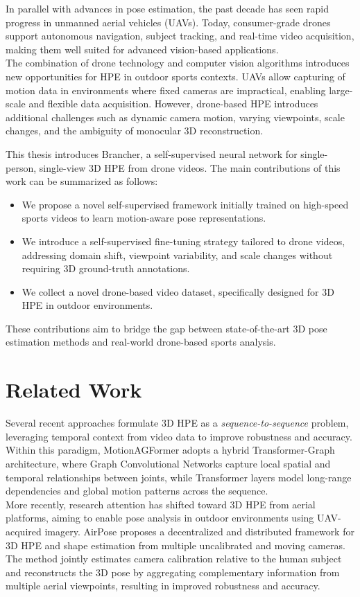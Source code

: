 \documentclass[11pt,a4paper,twocolumn]{article}
\begin{document}
In parallel with advances in pose estimation, the past decade has seen rapid progress in unmanned aerial vehicles (UAVs). Today, consumer-grade drones support autonomous navigation, subject tracking, and real-time video acquisition, 
making them well suited for advanced vision-based applications.\\
The combination of drone technology and computer vision algorithms introduces new opportunities for HPE in outdoor sports contexts. UAVs allow capturing of motion data in environments where fixed 
cameras are impractical, enabling large-scale and flexible data acquisition. However, drone-based HPE introduces additional challenges such as dynamic camera motion, varying viewpoints, scale changes, and the ambiguity 
of monocular 3D reconstruction.

This thesis introduces Brancher, a self-supervised neural network for single-person, single-view 3D HPE from drone videos. The main contributions of this work can be summarized as follows:
\begin{itemize}
    \item We propose a novel self-supervised framework initially trained on high-speed sports videos to learn motion-aware pose representations.
    \item We introduce a self-supervised fine-tuning strategy tailored to drone videos, addressing domain shift, viewpoint variability, and scale changes without requiring 3D ground-truth annotations.
    \item We collect a novel drone-based video dataset, specifically designed for 3D HPE in outdoor environments.
\end{itemize}
These contributions aim to bridge the gap between state-of-the-art 3D pose estimation methods and real-world drone-based sports analysis.


\section{Related Work}
Several recent approaches formulate 3D HPE as a \textit{sequence-to-sequence} problem, leveraging temporal context from video data to improve robustness and accuracy. Within this paradigm, MotionAGFormer \cite{mehraban2024motionagformer} 
adopts a hybrid Transformer-Graph architecture, where Graph Convolutional Networks capture local spatial and temporal relationships between joints, while Transformer layers model long-range 
dependencies and global motion patterns across the sequence.\\
More recently, research attention has shifted toward 3D HPE from aerial platforms, aiming to enable pose analysis in outdoor environments using UAV-acquired imagery. AirPose \cite{saini2022airpose} proposes a decentralized and distributed 
framework for 3D HPE and shape estimation from multiple uncalibrated and moving cameras. The method jointly estimates camera calibration relative to the human subject and reconstructs the 3D pose by aggregating complementary 
information from multiple aerial viewpoints, resulting in improved robustness and accuracy.
\end{document}
